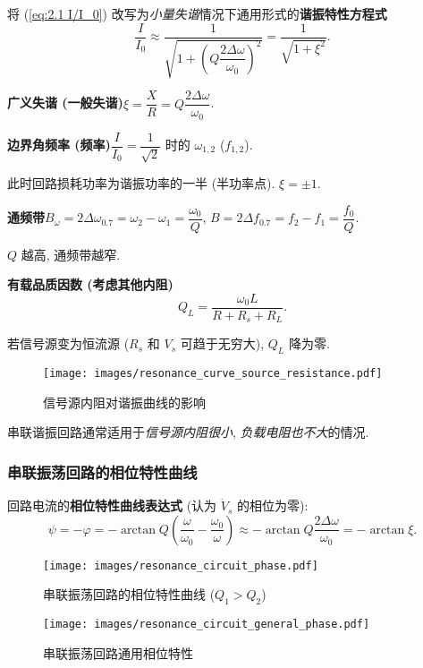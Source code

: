 \noindent 将 (\ref{eq:2.1 I/I_0}) 改写为\textit{小量失谐}情况下通用形式的\textbf{谐振特性方程式}
\begin{equation} \label{eq:2.1 I/I_0 xi}
    \frac{I}{I_0}\approx\frac{1}{\sqrt{1+\left(Q\dfrac{2\Delta\omega}{\omega_0}\right)^2}}=\frac{1}{\sqrt{1+\xi^2}}.
\end{equation}

\textbf{广义失谐 (一般失谐)}\quad $\xi=\dfrac{X}{R}=Q\dfrac{2\Delta\omega}{\omega_0}$. \label{eq:2.1 xi}

\textbf{边界角频率 (频率)}\quad $\dfrac{I}{I_0}=\dfrac{1}{\sqrt{2}}$ 时的 $\omega_{1,2}$ ($f_{1,2}$).

此时回路损耗功率为谐振功率的一半 (半功率点). $\xi=\pm 1$.

\textbf{通频带}\quad $B_\omega=2\Delta\omega_{0.7}=\omega_2-\omega_1=\dfrac{\omega_0}{Q}$, $B=2\Delta f_{0.7}=f_2-f_1=\dfrac{f_0}{Q}$.

$Q$ 越高, 通频带越窄.

\textbf{有载品质因数 (考虑其他内阻)}
\begin{equation}
    Q_L=\frac{\omega_0L}{R+R_s+R_L}.
\end{equation}

若信号源变为恒流源 ($R_s$ 和 $V_s$ 可趋于无穷大), $Q_L$ 降为零.

\begin{figure}[H]
    \centering
    \texttt{[image: images/resonance\_curve\_source\_resistance.pdf]}
    \caption{信号源内阻对谐振曲线的影响}
\end{figure}

串联谐振回路通常适用于\textit{信号源内阻很小}, \textit{负载电阻也不大}的情况.

\subsubsection{串联振荡回路的相位特性曲线} \label{串联振荡回路的相位特性曲线}

回路电流的\textbf{相位特性曲线表达式} (认为 $\dot{V}_s$ 的相位为零):
\begin{equation} \label{eq:2.1 psi}
    \psi=-\varphi=-\arctan Q\left(\frac{\omega}{\omega_0}-\frac{\omega_0}{\omega}\right)\approx-\arctan Q\frac{2\Delta\omega}{\omega_0}=-\arctan\xi.
\end{equation}

\begin{figure}[H]
    \centering
    \begin{minipage}{.356\textwidth}
        \centering
        \texttt{[image: images/resonance\_circuit\_phase.pdf]}
        \caption{串联振荡回路的相位特性曲线 ($Q_1>Q_2$)}
    \end{minipage}\qquad
    \begin{minipage}{.394\textwidth}
        \centering
        \texttt{[image: images/resonance\_circuit\_general\_phase.pdf]}
        \caption{串联振荡回路通用相位特性}
    \end{minipage}
\end{figure}

